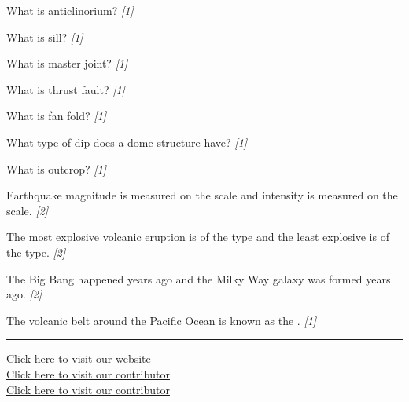 \documentclass[11pt,a4paper]{article}
\newcommand{\pts}[1]{\hfill   \textit{[#1]}}
\begin{document}
\begin{parts}
  \item What is anticlinorium? \pts{1}
  \item What is sill? \pts{1}
  \item What is master joint? \pts{1}
  \item What is thrust fault? \pts{1}
  \item What is fan fold? \pts{1}
  \item What type of dip does a dome structure have? \pts{1}
  \item What is outcrop? \pts{1}
  \item Earthquake magnitude is measured on the \underline{\hspace{3cm}} scale and intensity is measured on the \underline{\hspace{3cm}} scale. \pts{2}
  \item The most explosive volcanic eruption is of the \underline{\hspace{3cm}} type and the least explosive is of the \underline{\hspace{3cm}} type. \pts{2}
  \item The Big Bang happened \underline{\hspace{3cm}} years ago and the Milky Way galaxy was formed \underline{\hspace{3cm}} years ago. \pts{2}
  \item The volcanic belt around the Pacific Ocean is known as the \underline{\hspace{4cm}}. \pts{1}
\end{parts}

\vfill\rule{\linewidth}{0.4pt}

\begin{center}\small
\href{https://bhu-exam.vercel.app/}{Click here to visit our website}\\[4pt]
\href{https://me-aryan.vercel.app/}{Click here to visit our contributor}\\[4pt]
\href{https://quashan-me.vercel.app/}{Click here to visit our contributor}
\end{center}
\end{document}
